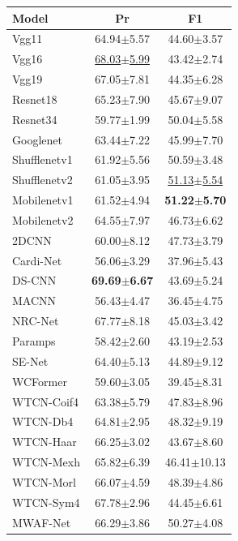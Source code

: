 \begin{minipage}[t]{0.50\linewidth}\vspace{0pt}\centering
\captionsetup{type=table}
\centering\color{black}
\caption{Additional CirCor Outcome precision and F1-score. Abnormal is the positive class.}\label{tab:circor_binary_segment}
\begingroup
\fontsize{8.5}{10.2}\selectfont
\setlength{\tabcolsep}{2pt}\renewcommand{\arraystretch}{1.01}
\begin{tabular*}{\linewidth}{@{\extracolsep{\fill}}lcc@{}}\toprule
\textbf{Model} & \textbf{Pr} & \textbf{F1}\\\midrule
Vgg11 & 64.94$\pm$5.57 & 44.60$\pm$3.57\\
Vgg16 & \underline{68.03$\pm$5.99} & 43.42$\pm$2.74\\
Vgg19 & 67.05$\pm$7.81 & 44.35$\pm$6.28\\
Resnet18 & 65.23$\pm$7.90 & 45.67$\pm$9.07\\
Resnet34 & 59.77$\pm$1.99 & 50.04$\pm$5.58\\
Googlenet & 63.44$\pm$7.22 & 45.99$\pm$7.70\\
\midrule
Shufflenetv1 & 61.92$\pm$5.56 & 50.59$\pm$3.48\\
Shufflenetv2 & 61.05$\pm$3.95 & \underline{51.13$\pm$5.54}\\
Mobilenetv1 & 61.52$\pm$4.94 & \textbf{51.22$\pm$5.70}\\
Mobilenetv2 & 64.55$\pm$7.97 & 46.73$\pm$6.62\\
\midrule
2DCNN~\cite{2DCNN} & 60.00$\pm$8.12 & 47.73$\pm$3.79\\
Cardi-Net~\cite{Cardi-Net} & 56.06$\pm$3.29 & 37.96$\pm$5.43\\
DS-CNN~\cite{DS-CNN} & \textbf{69.69$\pm$6.67} & 43.69$\pm$5.24\\
MACNN~\cite{chen2021multi} & 56.43$\pm$4.47 & 36.45$\pm$4.75\\
NRC-Net~\cite{NRC-Net} & 67.77$\pm$8.18 & 45.03$\pm$3.42\\
Paramps~\cite{Paramps} & 58.42$\pm$2.60 & 43.19$\pm$2.53\\
SE-Net~\cite{SE-Net} & 64.40$\pm$5.13 & 44.89$\pm$9.12\\
WCFormer~\cite{WCFormer} & 59.60$\pm$3.05 & 39.45$\pm$8.31\\
\midrule
WTCN-Coif4 & 63.38$\pm$5.79 & 47.83$\pm$8.96\\
WTCN-Db4 & 64.81$\pm$2.95 & 48.32$\pm$9.19\\
WTCN-Haar & 66.25$\pm$3.02 & 43.67$\pm$8.60\\
WTCN-Mexh & 65.82$\pm$6.39 & 46.41$\pm$10.13\\
WTCN-Morl & 66.07$\pm$4.59 & 48.39$\pm$4.86\\
WTCN-Sym4 & 67.78$\pm$2.96 & 44.45$\pm$6.61\\
\midrule
MWAF-Net & 66.29$\pm$3.86 & 50.27$\pm$4.08\\
\bottomrule\end{tabular*}
\endgroup
{}

\end{minipage}\hfill
